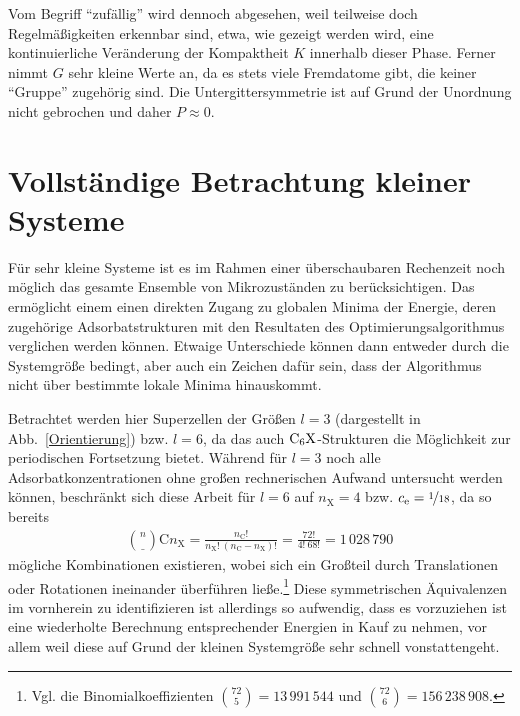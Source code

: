 \documentclass[a4paper, 10pt, twoside, openany]{book} %
\def \nC {n_\mathrm{C}}
\def \nX {n_\mathrm{X}}
\def \cE {c_\mathrm{e}}
\begin{document}
	Vom Begriff "`zufällig"' wird dennoch abgesehen, weil teilweise doch Regelmäßigkeiten erkennbar sind, etwa, wie gezeigt werden wird, eine kontinuierliche Veränderung der Kompaktheit $K$ innerhalb dieser Phase. Ferner nimmt $G$ sehr kleine Werte an, da es stets viele Fremdatome gibt, die keiner "`Gruppe"' zugehörig sind. Die Untergittersymmetrie ist auf Grund der Unordnung nicht gebrochen und daher $P \approx 0$.
	
	\section{Vollständige Betrachtung kleiner Systeme}
	\label{kleine Systeme}
	
	Für sehr kleine Systeme ist es im Rahmen einer überschaubaren Rechenzeit noch möglich das gesamte Ensemble von Mikrozuständen zu berücksichtigen. Das ermöglicht einem einen direkten Zugang zu globalen Minima der Energie, deren zugehörige Adsorbatstrukturen mit den Resultaten des Optimierungsalgorithmus verglichen werden können. Etwaige Unterschiede können dann entweder durch die Systemgröße bedingt, aber auch ein Zeichen dafür sein, dass der Algorithmus nicht über bestimmte lokale Minima hinauskommt.
	
	Betrachtet werden hier Superzellen der Größen $l = 3$ (dargestellt in Abb.~\ref{Orientierung}) bzw. $l = 6$, da das auch $\rm C_6X$-Strukturen die Möglichkeit zur periodischen Fortsetzung bietet. Während für $l = 3$ noch alle Adsorbatkonzentrationen ohne großen rechnerischen Aufwand untersucht werden können, beschränkt sich diese Arbeit für $l = 6$ auf $\nX = 4$ bzw. $\cE = \nicefrac 1 {18}$, da so bereits
	\begin{align*}
		\binom \nC \nX = \frac{\nC!}{\nX! \ (\nC - \nX)!} = \frac{72!}{4! \ 68!} = 1 \, 028 \, 790
	\end{align*}
	mögliche Kombinationen existieren, wobei sich ein Großteil durch Translationen oder Rotationen ineinander überführen ließe.\footnote{Vgl. die Binomialkoeffizienten $\binom {72} 5 = 13 \, 991 \, 544$ und $\binom {72} 6 = 156 \, 238 \, 908$.} Diese symmetrischen Äquivalenzen im vornherein zu identifizieren ist allerdings so aufwendig, dass es vorzuziehen ist eine wiederholte Berechnung entsprechender Energien in Kauf zu nehmen, vor allem weil diese auf Grund der kleinen Systemgröße sehr schnell vonstattengeht.
	
\end{document}
